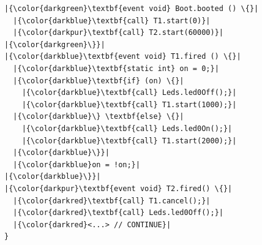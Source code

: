 \documentclass[letterpaper]{sig-alternate}
\begin{document}
\begin{figure}[!t]
\begin{minipage}[t]{0.27\linewidth}
\begin{lstlisting}[title=\emph{/* nesC */}]
|{\color{darkgreen}\textbf{event void} Boot.booted () \{}|
  |{\color{darkblue}\textbf{call} T1.start(0)}|
  |{\color{darkpur}\textbf{call} T2.start(60000)}|
|{\color{darkgreen}\}}|
|{\color{darkblue}\textbf{event void} T1.fired () \{}|
  |{\color{darkblue}\textbf{static int} on = 0;}|
  |{\color{darkblue}\textbf{if} (on) \{}|
    |{\color{darkblue}\textbf{call} Leds.led0Off();}|
    |{\color{darkblue}\textbf{call} T1.start(1000);}|
  |{\color{darkblue}\} \textbf{else} \{}|
    |{\color{darkblue}\textbf{call} Leds.led0On();}|
    |{\color{darkblue}\textbf{call} T1.start(2000);}|
  |{\color{darkblue}\}}|
  |{\color{darkblue}on = !on;}|
|{\color{darkblue}\}}|
|{\color{darkpur}\textbf{event void} T2.fired() \{}|
  |{\color{darkred}\textbf{call} T1.cancel();}|
  |{\color{darkred}\textbf{call} Leds.led0Off();}|
  |{\color{darkred}<...> // CONTINUE}|
}


\end{lstlisting}
\end{minipage}
\end{figure}
\end{document}
